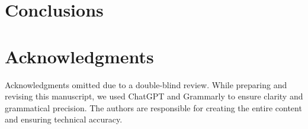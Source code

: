 \documentclass[sigconf,natbib=false]{acmart}
\begin{document}





\section{Conclusions}
\label{sec:conclusions}




\section*{Acknowledgments}
Acknowledgments omitted due to a double-blind review.
While preparing and revising this manuscript, we used ChatGPT and Grammarly to ensure clarity and grammatical precision. The authors are responsible for creating the entire content and ensuring technical accuracy.

\printbibliography[title={References}]
\end{document}

